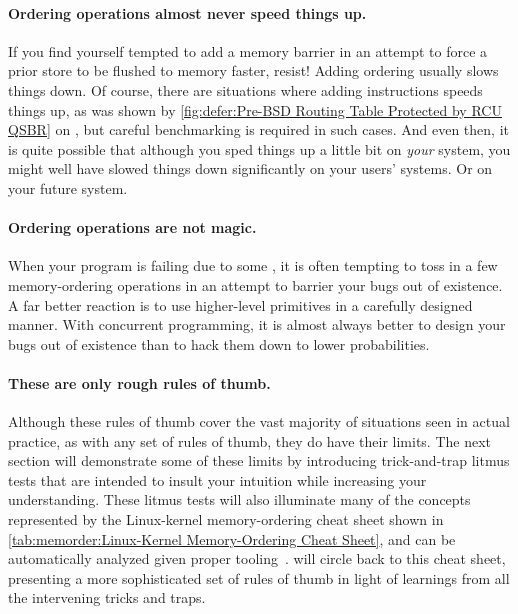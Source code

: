\paragraph{Ordering operations almost never speed things up.}
If you find yourself tempted to add a memory barrier in an attempt
to force a prior store to be flushed to memory faster, resist!
Adding ordering usually slows things down.
Of course, there are situations where adding instructions speeds things
up, as was shown by
\cref{fig:defer:Pre-BSD Routing Table Protected by RCU QSBR} on
,
but careful benchmarking is required in such cases.
And even then, it is quite possible that although you sped things up
a little bit on \emph{your} system, you might well have slowed things
down significantly on your users' systems.
Or on your future system.

\paragraph{Ordering operations are not magic.}
When your program is failing due to some , it is often
tempting to toss in a few memory-ordering operations in an attempt
to barrier your bugs out of existence.
A far better reaction is to use higher-level primitives in a carefully
designed manner.
With concurrent programming, it is almost always better to design your
bugs out of existence than to hack them down to lower probabilities.

\paragraph{These are only rough rules of thumb.}
Although these rules of thumb cover the vast majority of situations
seen in actual practice, as with any set of rules of thumb, they
do have their limits.
The next section will demonstrate some of these limits by introducing
trick-and-trap litmus tests that are intended to insult your
intuition while increasing your understanding.
These litmus tests will also illuminate many of the concepts
represented by the Linux-kernel memory-ordering cheat sheet shown in
\cref{tab:memorder:Linux-Kernel Memory-Ordering Cheat Sheet},
and can be automatically analyzed given proper
tooling~\cite{Alglave:2018:FSC:3173162.3177156}.
 will
circle back to this cheat sheet, presenting a more sophisticated set of
rules of thumb in light of learnings from all the intervening tricks
and traps.


